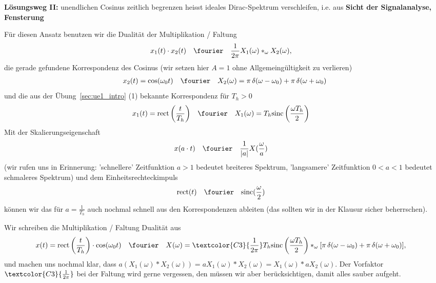 \begin{ExCalc}
\textbf{Lösungsweg II:}
\textcolor{C0}{unendlichen} Cosinus
\textcolor{C3}{zeitlich begrenzen}
heisst
\textcolor{C0}{ideales} Dirac-Spektrum
\textcolor{C3}{verschleifen}, i.e. aus \textbf{Sicht der Signalanalyse, Fensterung}

Für diesen Ansatz benutzen wir die Dualität der Multiplikation / Faltung
\begin{align}
x_1(t) \cdot x_2(t) &\quad \fourier \quad \frac{1}{2\pi} X_1(\omega) \ast_\omega X_2(\omega),
\end{align}
die gerade gefundene Korrespondenz des Cosinus
(wir setzen hier $A=1$ ohne Allgemeingültigkeit zu verlieren)
\begin{align}
x_2(t) = \cos(\omega_0 t) \quad\fourier\quad X_2(\omega) = \pi \, \delta(\omega-\omega_0) + \pi \, \delta(\omega+\omega_0)
\end{align}
und die aus der Übung~\ref{sec:ue1_intro} (1) bekannte Korrespondenz für $T_h>0$
\begin{align}
x_1(t) = \mathrm{rect}\left(\frac{t}{T_h}\right) &\quad \fourier \quad X_1(\omega) = T_h \mathrm{sinc}\left(\frac{\omega T_h}{2}\right)
\end{align}
%
Mit der Skalierungseigenschaft
\begin{align}
x(a \cdot t) &\quad \fourier \quad \frac{1}{|a|}X(\frac{\omega}{a})
\end{align}
(wir rufen uns in Erinnerung: 'schnellere' Zeitfunktion $a>1$ bedeutet breiteres Spektrum,
'langsamere' Zeitfunktion $0<a<1$ bedeutet schmaleres Spektrum)
%
und dem Einheitsrechteckimpuls
\begin{align}
\mathrm{rect}(t) &\quad \fourier \quad \mathrm{sinc}(\frac{\omega}{2})
\end{align}
%
können wir das für $a=\frac{1}{T_h}$ auch nochmal schnell aus den Korrespondenzen
ableiten (das sollten wir in der Klausur sicher beherrschen).

Wir schreiben die Multiplikation / Faltung Dualität aus
\begin{align}
x(t) = \mathrm{rect}\left(\frac{t}{T_h}\right) \cdot \cos(\omega_0 t)
&\quad \fourier \quad
X(\omega) = \textcolor{C3}{\frac{1}{2\pi}}
T_h \mathrm{sinc}\left(\frac{\omega T_h}{2}\right) \ast_\omega
[\pi \, \delta(\omega-\omega_0) + \pi \, \delta(\omega+\omega_0)],
\end{align}
und machen uns nochmal klar, dass
$a ( X_1(\omega) \ast X_2(\omega) ) = a X_1(\omega)\ast X_2(\omega) = X_1(\omega) \ast a X_2(\omega)$.
%
Der Vorfaktor $\textcolor{C3}{\frac{1}{2\pi}}$ bei der Faltung wird gerne vergessen,
den müssen wir aber berücksichtigen, damit alles sauber aufgeht.


\end{ExCalc}
